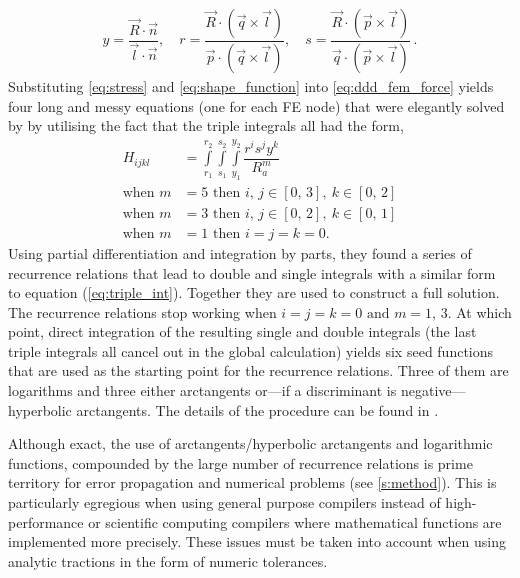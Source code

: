 \documentclass[11pt]{iopart}
\begin{document}
%
\begin{align}
    y = \dfrac{\vec{R}\cdot \vec{n}}{\vec{l}\cdot \vec{n}} \label{eq:problem},\quad
    r = \dfrac{\vec{R}\cdot (\vec{q} \times \vec{l})}{\vec{p}\cdot (\vec{q} \times \vec{l})}, \quad
    s = \dfrac{\vec{R}\cdot (\vec{p} \times \vec{l})}{\vec{q}\cdot (\vec{p} \times \vec{l})}\,.
\end{align}
%
Substituting \cref{eq:stress} and \cref{eq:shape_function} into \cref{eq:ddd_fem_force} yields four long and messy equations (one for each FE node) that were elegantly solved by \citet{Queyreau} by utilising the fact that the triple integrals all had the form,
%
\begin{align}
    H_{ijkl}        & = \int\limits_{r_{1}}^{r_{2}}\int\limits_{s_{1}}^{s_{2}}\int\limits_{y_{1}}^{y_{2}} \dfrac{r^i s^j y^k}{R_{a}^{m}}\label{eq:triple_int} \\
    \textrm{when }m & = 5 \textrm{ then } i,\, j \in [0,\,3],~k \in [0,\,2]\nonumber                                                                          \\
    \textrm{when }m & = 3 \textrm{ then } i,\, j \in [0,\,2],~k \in [0,\,1]\nonumber                                                                          \\
    \textrm{when }m & = 1 \textrm{ then } i = j = k = 0\nonumber.
\end{align}
%
Using partial differentiation and integration by parts, they found a series of recurrence relations that lead to double and single integrals with a similar form to equation (\cref{eq:triple_int}). Together they are used to construct a full solution. The recurrence relations stop working when $i = j = k = 0 \textrm{ and } m = 1,\, 3$. At which point, direct integration of the resulting single and double integrals (the last triple integrals all cancel out in the global calculation) yields six seed functions that are used as the starting point for the recurrence relations. Three of them are logarithms and three either arctangents or---if a discriminant is negative---hyperbolic arctangents. The details of the procedure can be found in \cite{Queyreau}.

Although exact, the use of arctangents/hyperbolic arctangents and logarithmic functions, compounded by the large number of recurrence relations is prime territory for error propagation and numerical problems (see \cref{s:method}). This is particularly egregious when using general purpose compilers instead of high-performance or scientific computing compilers where mathematical functions are implemented more precisely. These issues must be taken into account when using analytic tractions in the form of numeric tolerances.
\end{document}
